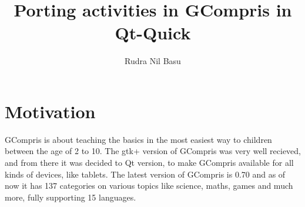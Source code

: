 \documentclass[preprint,12pt]{elsarticle}
\begin{document}
\begin{frontmatter}



\title{Porting activities in GCompris in Qt-Quick}


\author{Rudra Nil Basu}

\address{ \textbf{Email ID}: rudra.nil.basu.1996@gmail.com}
\address{ \textbf{Freenode IRC Nick}: rudra}
\address{ \textbf{Location}: Kolkata, West Bengal, India UTC+5.30}
\address{ \textbf{Mentor}: Bruno Coudoin (bruno.coudoin@gcompris.net)}
\address{ \textbf{Co-Mentor}: Johnny Jazeix (jazeix@gmail.com), }

\end{frontmatter}


\section{Motivation}
\label{S:1}

GCompris is about teaching the basics in the most easiest way to children between the age of 2 to 10. The gtk+ version of GCompris was very well recieved, and from there it was decided to Qt version, to make GCompris available for all kinds of devices, like tablets. The latest version of GCompris is 0.70 and as of now it has 137 categories on various topics like science, maths, games and much more, fully supporting 15 languages.
\end{document}
